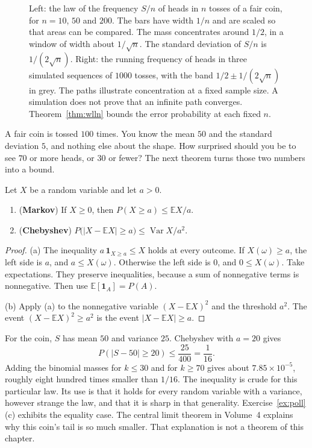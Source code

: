 \begin{figure}[ht]
\centering
{}
\caption{Left: the law of the frequency $S/n$ of heads in $n$ tosses of a fair coin, for $n=10$, $50$ and $200$. The bars have width $1/n$ and are scaled so that areas can be compared. The mass concentrates around $1/2$, in a window of width about $1/\sqrt n$. The standard deviation of $S/n$ is $1/(2\sqrt n)$. Right: the running frequency of heads in three simulated sequences of $1000$ tosses, with the band $1/2\pm 1/(2\sqrt n)$ in grey. The paths illustrate concentration at a fixed sample size. A simulation does not prove that an infinite path converges. Theorem~\ref{thm:wlln} bounds the error probability at each fixed $n$.}
\label{fig:binomial}
\end{figure}

\begin{think}
A fair coin is tossed $100$ times. You know the mean $50$ and the standard deviation $5$, and nothing else about the shape. How surprised should you be to see $70$ or more heads, or $30$ or fewer? The next theorem turns those two numbers into a bound.
\end{think}

\begin{theorem}\label{thm:chebyshev}
Let $X$ be a random variable and let $a>0$.
\begin{enumerate}[label=(\alph*)]
\item (\textbf{Markov}) If $X\ge0$, then $P(X\ge a)\le \mathbb EX/a$.
\item (\textbf{Chebyshev}) $P\bigl(|X-\mathbb EX|\ge a\bigr)\le \operatorname{Var}X/a^2$.
\end{enumerate}
\end{theorem}
\begin{proof}
(a) The inequality $a\,\mathbf1_{X\ge a}\le X$ holds at every outcome. If $X(\omega)\ge a$, the left side is $a$, and $a\le X(\omega)$. Otherwise the left side is $0$, and $0\le X(\omega)$. Take expectations. They preserve inequalities, because a sum of nonnegative terms is nonnegative. Then use $\mathbb E[\mathbf1_A]=P(A)$.

(b) Apply (a) to the nonnegative variable $(X-\mathbb EX)^2$ and the threshold $a^2$. The event $(X-\mathbb EX)^2\ge a^2$ is the event $|X-\mathbb EX|\ge a$.
\end{proof}

For the coin, $S$ has mean $50$ and variance $25$. Chebyshev with $a=20$ gives
\[
 P(|S-50|\ge20)\le\frac{25}{400}=\frac1{16}.
\]
Adding the binomial masses for $k\le30$ and for $k\ge70$ gives about $7.85\times10^{-5}$, roughly eight hundred times smaller than $1/16$. The inequality is crude for this particular law. Its use is that it holds for every random variable with a variance, however strange the law, and that it is sharp in that generality. Exercise~\ref{ex:poll}(c) exhibits the equality case. The central limit theorem in Volume~4 explains why this coin's tail is so much smaller. That explanation is not a theorem of this chapter.

